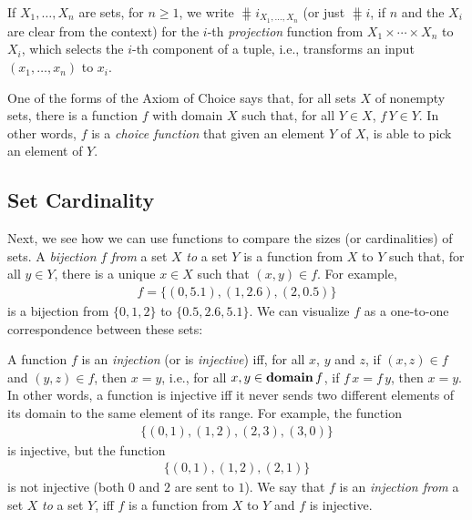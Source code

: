 If $X_1,\ldots,X_n$ are sets, for $n\geq 1$, we write %
%
%
%
$\hash{i}_{X_1,\ldots,X_n}$ (or just $\hash{i}$, if $n$ and the $X_i$
are clear from the context) for the $i$-th \emph{projection} function
from $X_1\times\cdots\times X_n$ to $X_i$, which selects the $i$-th component of
a tuple, i.e., transforms an input $(x_1,\ldots,x_n)$ to $x_i$.

One of the forms of the Axiom of Choice
%
says that, for all sets $X$ of nonempty sets, there is a function $f$
with domain $X$ such that, for all $Y\in X$, $f\,Y\in Y$. In other
words, $f$ is a \emph{choice function}
%
that given an element $Y$ of $X$, is able to pick an element of $Y$.

\subsection{Set Cardinality}

%
%
%
%
Next, we see how we can use functions to compare the sizes
(or cardinalities) of sets.
A \emph{bijection}
%
%
$f$ \emph{from} a set $X$ \emph{to} a set $Y$ is
a function from $X$ to $Y$ such that, for all $y\in Y$, there is a
unique $x\in X$ such that $(x,y)\in f$.
For example,
\begin{gather*}
f=\{(0,5.1),(1,2.6),(2,0.5)\}
\end{gather*}
is a bijection from $\{0,1,2\}$ to $\{0.5,2.6,5.1\}$.
We can visualize $f$ as a one-to-one correspondence
%
between these sets:
\begin{center}

\end{center}

A function $f$ is an \emph{injection} (or is \emph{injective})
%
%
%
%
iff, for all $x$, $y$ and $z$, if $(x,z)\in f$ and $(y,z)\in f$, then
$x=y$, i.e., for all $x,y\in\mathbf{domain}\,f$, if $f\,x=f\,y$, then $x=y$.
In other words, a function is injective iff it never sends two
different elements of its domain to the same element of its range.
For example, the function
\begin{gather*}
\{(0, 1), (1, 2), (2, 3), (3, 0)\}
\end{gather*}
is injective, but the function
\begin{gather*}
\{(0, 1), (1, 2), (2, 1)\}
\end{gather*}
is not injective (both $0$ and $2$ are sent to $1$).  We say that $f$
is an \emph{injection from} a set $X$ \emph{to} a set $Y$, iff $f$ is
%
%
a function from $X$ to $Y$ and $f$ is injective.

